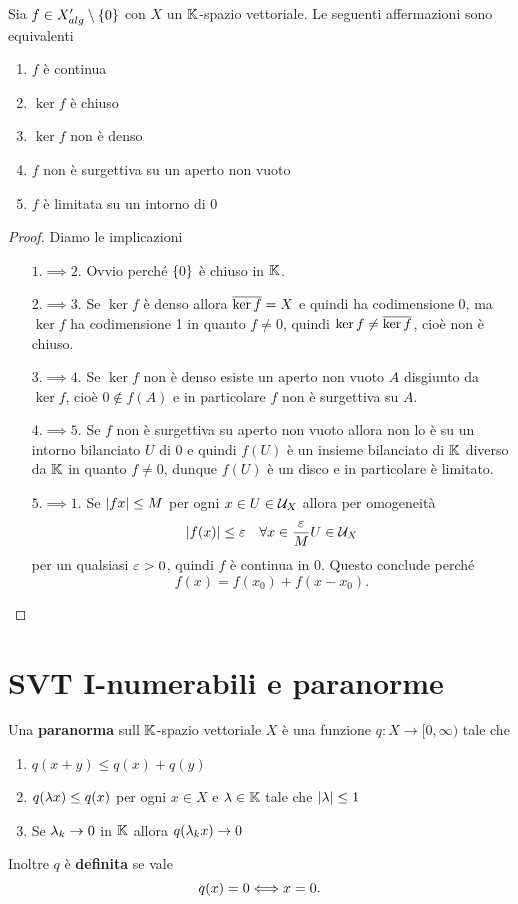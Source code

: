 \begin{proposition}\label{PrCaratterizzazioneFunzionaliContinui}
Sia $f\in X'_{alg}\setminus\{0\}$ con $X$ un $\mathbb{K}$-spazio vettoriale. Le seguenti affermazioni sono equivalenti
\begin{enumerate}
    \item $f$ \`e continua
    \item $\ker f$ \`e chiuso
    \item $\ker f$ non \`e denso
    \item $f$ non \`e surgettiva su un aperto non vuoto
    \item $f$ \`e limitata su un intorno di $0$
\end{enumerate}
\end{proposition}
\begin{proof}
    Diamo le implicazioni
\setlength{\leftmargini}{0cm}
\begin{itemize}
\item[$\boxed{1.\implies2.}$] Ovvio perch\'e $\left\{{0}\right\}$ \`e chiuso in $\mathbb{K}$.
\item[$\boxed{2.\implies3.}$] Se $\ker f$ \`e denso allora $\overline{\ker f}=X$ e quindi ha codimensione 0, ma $\ker f$ ha codimensione 1 in quanto $f\neq0$, quindi $\ker f\neq \overline{\ker f}$, cio\`e non \`e chiuso.
\item[$\boxed{3.\implies4.}$] Se $\ker f$ non \`e denso esiste un aperto non vuoto $A$ disgiunto da $\ker f$, cio\`e $0\notin f(A)$ e in particolare $f$ non \`e surgettiva su $A$.
\item[$\boxed{4.\implies5.}$] Se $f$ non \`e surgettiva su aperto non vuoto allora non lo \`e su un intorno bilanciato $U$ di $0$ e quindi $f(U)$ \`e un insieme bilanciato di $\mathbb{K}$ diverso da $\mathbb{K}$ in quanto $f\neq 0$, dunque $f(U)$ \`e un disco e in particolare \`e limitato.
\item[$\boxed{5.\implies1.}$] Se $\left|{fx}\right|\leq M$ per ogni $x\in U\in\mathcal{U}_X$ allora per omogeneit\`a
\[\left|{f(x)}\right|\leq \varepsilon\quad \forall x\in \frac{\varepsilon} M U\in \mathcal{U}_X\]
per un qualsiasi $\varepsilon>0$, quindi $f$ \`e continua in $0$. Questo conclude perch\'e
\[f(x)=f(x_0)+f(x-x_0).\]
\end{itemize}
\setlength{\leftmargini}{0.5cm}
\end{proof}

\section{SVT I-numerabili e paranorme}
\begin{definition}[Paranorma]
Una \textbf{paranorma} sull $\mathbb{K}$-spazio vettoriale $X$ \`e una funzione $q:X\to[0,\infty)$ tale che
\begin{enumerate}
    \item $q(x+y)\leq q(x)+q(y)$
    \item $q(\lambda x)\leq q(x)$ per ogni $x\in X$ e $\lambda\in\mathbb{K}$ tale che $\left|{\lambda}\right|\leq 1$
    \item Se $\lambda_k\to 0$ in $\mathbb{K}$ allora $q(\lambda_k x)\to 0$
\end{enumerate}
Inoltre $q$ \`e \textbf{definita} se vale
\[q(x)=0\Longleftrightarrow x=0.\]
\end{definition}

